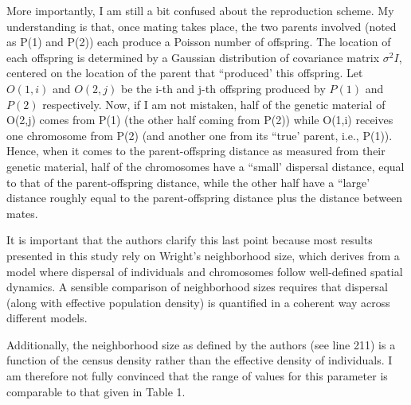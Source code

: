 
\begin{point}{}
More importantly, I am still a bit confused about the reproduction scheme. My understanding is that, once mating takes place, the two parents involved (noted as P(1) and P(2)) each produce a Poisson number of offspring. The location of each offspring is determined by a Gaussian distribution of covariance matrix $\sigma^2 I$, centered on the location of the parent that ``produced' this offspring. Let $O(1,i)$ and $O(2,j)$ be the i-th and j-th offspring produced by $P(1)$ and $P(2)$ respectively. Now, if I am not mistaken, half of the genetic material of O(2,j) comes from P(1) (the other half coming from P(2)) while O(1,i) receives one chromosome from P(2) (and another one from its ``true' parent, i.e., P(1)). Hence, when it comes to the parent-offspring distance as measured from their genetic material, half of the chromosomes have a ``small' dispersal distance, equal to that of the parent-offspring distance, while the other half have a ``large' distance roughly equal to the parent-offspring distance plus the distance between mates.

It is important that the authors clarify this last point because most results presented in this study rely on Wright's neighborhood size, which derives from a model where dispersal of individuals and chromosomes follow well-defined spatial dynamics. A sensible comparison of neighborhood sizes requires that dispersal (along with effective population density) is quantified in a coherent way across different models.

Additionally, the neighborhood size as defined by the authors (see line 211) is a function of the census density rather than the effective density of individuals. I am therefore not fully convinced that the range of values for this parameter is comparable to that given in Table 1.
\end{point}

